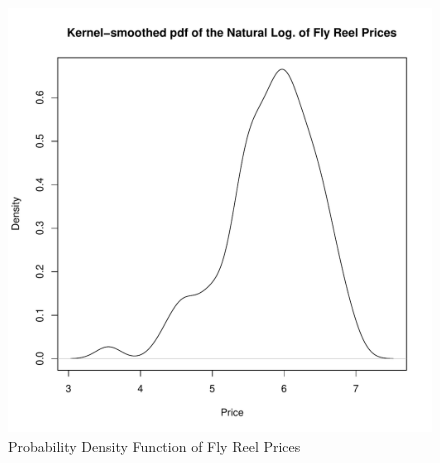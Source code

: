 \documentclass[11pt]{book}
\begin{document}
\begin{figure}[h!]
  \centering
  \includegraphics[scale = 0.5, keepaspectratio=true]{../Figures/density_prices}
  \caption{Probability Density Function of Fly Reel Prices} \label{fig:density_prices}
\end{figure}



\end{document}
